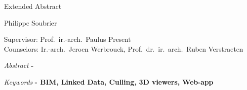 \begin{center}
    \sffamily
    \huge Extended Abstract

    \Large Philippe Soubrier

    \normalsize
    Supervisor: Prof.\ ir.-arch.\ Paulus Present         \\
    Counselors: Ir.-arch.\ Jeroen Werbrouck, Prof.\ dr.\ ir.\ arch.\ Ruben Verstraeten
\end{center}
\begin{multicols}{2}
    \small
    \emph{Abstract} \textbf{
        - \lipsum[1]
    }

    \emph{Keywords} \textbf{
        - BIM, Linked Data, Culling, 3D viewers, Web-app
    }
    
    \lipsum[1-9]

\end{multicols}
\restoregeometry